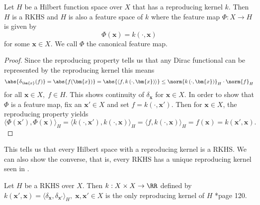 \begin{lem}[] \label{lem: RKHS_rk_k}
    Let $H$ be a Hilbert function space over $X$ that has a reproducing kernel $k$. Then $H$ is a RKHS and $H$ is also a feature space of $k$ where the feature map $\Phi : X \to H$ is given by
    \[
        \Phi (\bm{x}) = k \left( \cdot , \bm{x}  \right)
    \]
    for some $\bm{x} \in X$. We call $\Phi$ the canonical feature map.
\end{lem}

\begin{proof}
    Since the reproducing property tells us that any Dirac functional can be represented by the reproducing kernel this means
    \[
        \abs{\delta_{\bm{x}} (f)} = \abs{f(\bm{x})} = \abs{\langle f , k \left( \cdot, \bm{x} \right) \rangle} \leq \norm{k \left( \cdot, \bm{x} \right)}_H \cdot \norm{f}_H
    \]
    for all $\bm{x} \in X, \; f \in H$. This shows continuity of $\delta_{\bm{x}}$ for $\bm{x} \in X$. In order to show that $\Phi$ is a feature map, fix an $\bm{x}' \in X$ and set $f = k \left( \cdot, \bm{x}' \right)$. Then for $\bm{x} \in X$, the reproducing property yields
    \[
        \langle \Phi (\bm{x}') , \Phi (\bm{x}) \rangle_H = \langle k \left( \cdot, \bm{x}' \right) , k \left( \cdot, \bm{x} \right) \rangle_H = \langle f , k \left( \cdot, \bm{x} \right) \rangle_H = f(\bm{x}) = k \left( \bm{x}', \bm{x} \right).
    \]
\end{proof}

This tells us that every Hilbert space with a reproducing kernel is a RKHS. We can also show the converse, that is, every RKHS has a unique reproducing kernel seen in .

\begin{thm} \label{theorem: unique_kernel}
    Let $H$ be a RKHS over $X$. Then $k: X \times X \to \RR$ defined by $k \left( \bm{x}', \bm{x} \right) = \langle \delta_{\bm{x}} , \delta_{\bm{x}'} \rangle_H, \; \bm{x} , \bm{x}' \in X$ is the only reproducing kernel of $H$ \cite{SteinwartIngo2008SVMb}*{page 120}.
\end{thm}

